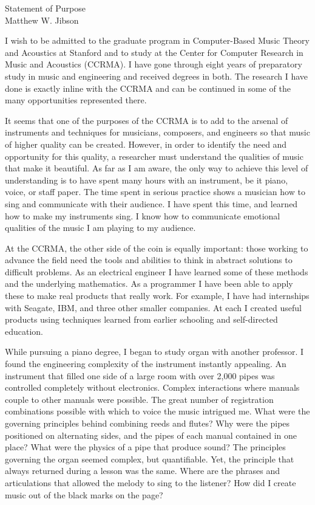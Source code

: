 \documentclass[12pt]{article}
\begin{document}
\begin{center}
Statement of Purpose \\
Matthew W. Jibson
\end{center}

I wish to be admitted to the graduate program in Computer-Based Music Theory and Acoustics at Stanford and to study at the Center for Computer Research in Music and Acoustics (CCRMA). I have gone through eight years of preparatory study in music and engineering and received degrees in both. The research I have done is exactly inline with the CCRMA and can be continued in some of the many opportunities represented there.

It seems that one of the purposes of the CCRMA is to add to the arsenal of instruments and techniques for musicians, composers, and engineers so that music of higher quality can be created. However, in order to identify the need and opportunity for this quality, a researcher must understand the qualities of music that make it beautiful. As far as I am aware, the only way to achieve this level of understanding is to have spent many hours with an instrument, be it piano, voice, or staff paper. The time spent in serious practice shows a musician how to sing and communicate with their audience. I have spent this time, and learned how to make my instruments sing. I know how to communicate emotional qualities of the music I am playing to my audience.

At the CCRMA, the other side of the coin is equally important: those working to advance the field need the tools and abilities to think in abstract solutions to difficult problems. As an electrical engineer I have learned some of these methods and the underlying mathematics. As a programmer I have been able to apply these to make real products that really work. For example, I have had internships with Seagate, IBM, and three other smaller companies. At each I created useful products using techniques learned from earlier schooling and self-directed education.

While pursuing a piano degree, I began to study organ with another professor. I found the engineering complexity of the instrument instantly appealing. An instrument that filled one side of a large room with over 2,000 pipes was controlled completely without electronics. Complex interactions where manuals couple to other manuals were possible. The great number of registration combinations possible with which to voice the music intrigued me. What were the governing principles behind combining reeds and flutes? Why were the pipes positioned on alternating sides, and the pipes of each manual contained in one place? What were the physics of a pipe that produce sound? The principles governing the organ seemed complex, but quantifiable. Yet, the principle that always returned during a lesson was the same. Where are the phrases and articulations that allowed the melody to sing to the listener? How did I create music out of the black marks on the page?
\end{document}
